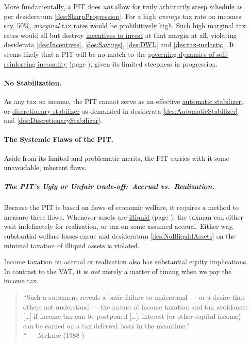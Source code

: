 More fundamentally, a PIT does \emph{not} allow for truly \hyperref[des:SharpProgression]{arbitrarily steep schedule} as per desideratum \ref{des:SharpProgression}.
For a high \emph{average} tax rate on incomes say, 50\%, \emph{marginal} tax rates would be prohibitively high.
Such high marginal tax rates would all but destroy \hyperref[des:Incentives]{incentives to invest} at that margin at all, violating desiderata \ref{des:Incentives}, \ref{des:Savings}, \ref{des:DWL} and \ref{des:tax-inelastic}.
It seems likely that a PIT will be no match to the \hyperref[sec:GovDynofIneq]{governing dynamics of self-reinforcing inequality} (page \pageref{sec:GovDynofIneq}), given its limited steepness in progression.

\paragraph{No Stabilization.} As any tax on income, the PIT cannot serve as an effective \hyperref[des:AutomaticStabilizer]{automatic stabilizer}, or \hyperref[des:DiscretionaryStabilizer]{discretionary stabilizer} as demanded in desiderata \ref{des:AutomaticStabilizer} and \ref{des:DiscretionaryStabilizer}.

\paragraph{The Systemic Flaws of the PIT.} Aside from its limited and problematic merits, the PIT carries with it some unavoidable, inherent flaws.

\subparagraph{The PIT's Ugly or Unfair trade-off:~Accrual vs.~Realization.} Because the PIT is based on flows of economic welfare, it requires a method to measure these flows.
Whenever assets are \hyperref[sec:Illiquid]{illiquid} (page \pageref{sec:Illiquid}), the taxman can either wait indefinetely for realization, or tax on some assumed accrual.
Either way, substantial welfare losses ensue and desideratum \ref{des:NoIlliquidAssets} on the \hyperref[des:NoIlliquidAssets]{minimal taxation of illiquid assets} is violated.

Income taxation on accrual or realization also has substantial equity implications.
In contrast to the VAT, it is \emph{not} merely a matter of timing when we pay the income tax.

\begin{quote}
	``Such a statement reveals a basic failure to understand --- or a desire that others not understand --- the nature of income taxation and tax avoidance:
	[\ldots] if income tax can be postponed [\ldots], interest (or other capital income) can be earned on a tax deferred basis in the meantime.''
	\\*
	--- McLure (1988 \citealt[as cited in][125]{Seidman1997})
\end{quote}

